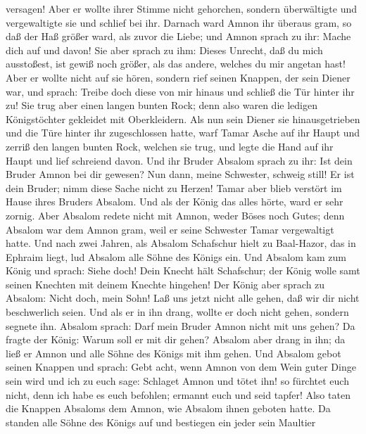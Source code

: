 versagen!  Aber er wollte ihrer Stimme nicht gehorchen,
sondern überwältigte und vergewaltigte sie und schlief bei ihr.
 Darnach ward Amnon ihr überaus gram, so daß der Haß
größer ward, als zuvor die Liebe; und Amnon sprach zu ihr: Mache dich
auf und davon!  Sie aber sprach zu ihm: Dieses Unrecht,
daß du mich ausstoßest, ist gewiß noch größer, als das andere, welches
du mir angetan hast! Aber er wollte nicht auf sie hören, 
sondern rief seinen Knappen, der sein Diener war, und sprach: Treibe
doch diese von mir hinaus und schließ die Tür hinter ihr zu!
 Sie trug aber einen langen bunten Rock; denn also waren
die ledigen Königstöchter gekleidet mit Oberkleidern. 
Als nun sein Diener sie hinausgetrieben und die Türe hinter ihr
zugeschlossen hatte, warf Tamar Asche auf ihr Haupt und zerriß den
langen bunten Rock, welchen sie trug, und legte die Hand auf ihr Haupt
und lief schreiend davon.  Und ihr Bruder Absalom sprach
zu ihr: Ist dein Bruder Amnon bei dir gewesen? Nun dann, meine
Schwester, schweig still! Er ist dein Bruder; nimm diese Sache nicht zu
Herzen! Tamar aber blieb verstört im Hause ihres Bruders Absalom.
 Und als der König das alles hörte, ward er sehr zornig.
 Aber Absalom redete nicht mit Amnon, weder Böses noch
Gutes; denn Absalom war dem Amnon gram, weil er seine Schwester Tamar
vergewaltigt hatte.  Und nach zwei Jahren, als Absalom
Schafschur hielt zu Baal-Hazor, das in Ephraim liegt, lud Absalom alle
Söhne des Königs ein.  Und Absalom kam zum König und
sprach: Siehe doch! Dein Knecht hält Schafschur; der König wolle samt
seinen Knechten mit deinem Knechte hingehen!  Der König
aber sprach zu Absalom: Nicht doch, mein Sohn! Laß uns jetzt nicht alle
gehen, daß wir dir nicht beschwerlich seien. Und als er in ihn drang,
wollte er doch nicht gehen, sondern segnete ihn.  Absalom
sprach: Darf mein Bruder Amnon nicht mit uns gehen? Da fragte der König:
Warum soll er mit dir gehen?  Absalom aber drang in ihn;
da ließ er Amnon und alle Söhne des Königs mit ihm gehen.
 Und Absalom gebot seinen Knappen und sprach: Gebt acht,
wenn Amnon von dem Wein guter Dinge sein wird und ich zu euch sage:
Schlaget Amnon und tötet ihn! so fürchtet euch nicht, denn ich habe es
euch befohlen; ermannt euch und seid tapfer!  Also taten
die Knappen Absaloms dem Amnon, wie Absalom ihnen geboten hatte. Da
standen alle Söhne des Königs auf und bestiegen ein jeder sein Maultier
